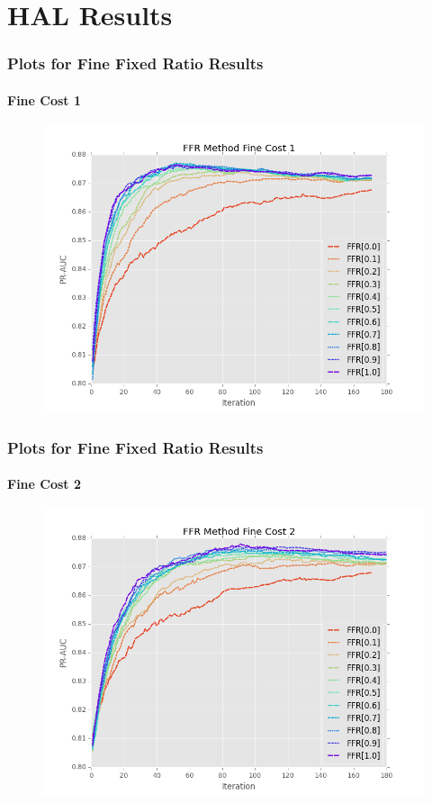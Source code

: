 \documentclass{beamer}
\begin{document}
\section{HAL Results}
\begin{frame}
    \frametitle{Plots for Fine Fixed Ratio Results}  %
    \framesubtitle{Fine Cost 1}
    \begin{figure}[!htb]
	\centering
    \includegraphics[width=0.8\columnwidth]{fig/ParamsFFR_PR_Cost1_rnds0_180}
\end{figure}
\end{frame}
\begin{frame}
    \frametitle{Plots for Fine Fixed Ratio Results}  %
    \framesubtitle{Fine Cost 2}
    \begin{figure}[!htb]
        \centering
        \includegraphics[width=0.8\columnwidth]{fig/ParamsFFR_PR_Cost2_rnds0_180}
        \label{fig:ParamsFFR_PR_Cost2_rnds0_180}
    \end{figure}
\end{frame}
\end{document}
